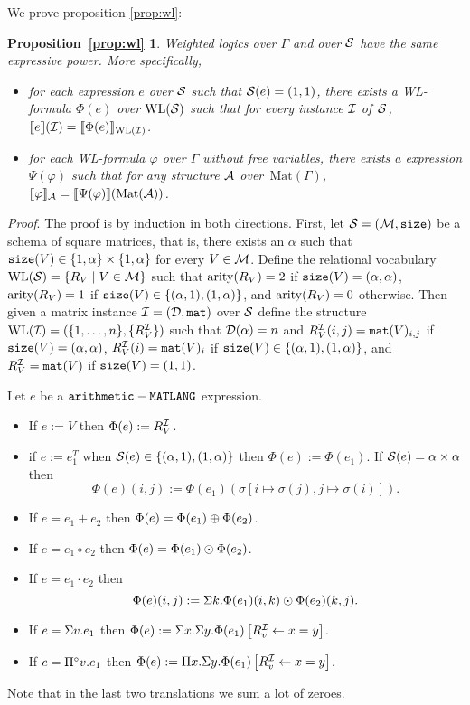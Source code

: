 \newtheorem*{WL}{Proposition~\ref{prop:wl}}

We prove proposition \ref{prop:wl}:

\begin{WL}
  Weighted logics over $\Gamma$ and \langprod over $\mathcal{S}$ have the same expressive power. More specifically,
  \begin{itemize}
  	\item for each \langprod expression $e$ over $\mathcal{S}$ such that $\mathcal{S}(e)=(1,1)$, there exists a WL-formula $\Phi(e)$ over $\text{WL}(\mathcal{S})$ such that for every instance $\mathcal{I}$ of~$\mathcal{S}$, 
  	$
  	\llbracket e \rrbracket(\mathcal{I}) = \llbracket \Phi(e) \rrbracket_{\text{WL}(\mathcal{I})}
  	$.
  	\item for each WL-formula $\varphi$ over $\Gamma$ without free variables, there exists a \langprod expression $\Psi(\varphi)$ such that for any structure $\mathcal{A}$ over~$\text{Mat}(\Gamma)$,
  	$
  	\llbracket \varphi \rrbracket_{\mathcal{A}}=\llbracket \Psi(\varphi) \rrbracket(\text{Mat}(\mathcal{A}))
  	$.
  \end{itemize}	
\end{WL}

\textit{Proof}. The proof is by induction in both directions. 
First, let $\mathcal{S}=(\mathcal{M},\texttt{size})$ be a schema of square matrices, that is, there exists an $\alpha$ such 
that $\texttt{size}(V) \in \{1, \alpha\} \times \{1,\alpha\}$ for every $V \in \mathcal{M}$.
Define the relational vocabulary $\text{WL}(\mathcal{S}) = \{R_V \mid V \in \mathcal{M}\}$ such that $\operatorname{arity}(R_V) = 2$ 
if $\texttt{size}(V) = (\alpha, \alpha)$, $\operatorname{arity}(R_V) = 1$ if $\texttt{size}(V) \in \{(\alpha,1), (1,\alpha)\}$, and 
$\operatorname{arity}(R_V) = 0$ otherwise.
Then given a matrix instance $\mathcal{I} = (\mathcal{D},\texttt{mat})$ over $\mathcal{S}$ define the structure 
$\text{WL}(\mathcal{I}) = (\{1, \ldots, n\}, \{R_V^{\mathcal{I}}\} )$ such that $\mathcal{D}(\alpha) = n$ and 
$R_V^{\mathcal{I}}(i, j) = \texttt{mat}(V)_{i,j}$ if $\texttt{size}(V) = (\alpha, \alpha)$, $R_V^{\mathcal{I}}(i) = \texttt{mat}(V)_{i}$ 
if $\texttt{size}(V) \in \{(\alpha,1), (1,\alpha)\}$, and $R_V^{\mathcal{I}} = \texttt{mat}(V)$ if $\texttt{size}(V) = (1,1)$.

Let $e$ be a $\texttt{arithmetic}-\texttt{MATLANG}$ expression.
\begin{itemize}
  \item If $e:=V$ then $\Phi(e):=R_V^{\mathcal{I}}$.
  \item if $e:= e_1^T$ when $\mathcal{S}(e)\in \{(\alpha,1), (1,\alpha)\}$ then $\Phi(e):=\Phi(e_1)$. If $\mathcal{S}(e)=\alpha\times\alpha$ then
  $$
  \Phi(e)(i,j):=\Phi(e_1)(\sigma\left[ i\mapsto \sigma(j), j\mapsto \sigma(i) \right]).
  $$
  \item If $e=e_1+e_2$ then $\Phi(e)=\Phi(e_1)\oplus \Phi(e_2)$.
  \item If $e=e_1\circ e_2$ then $\Phi(e)=\Phi(e_1)\odot \Phi(e_2)$.
  \item If $e=e_1\cdot e_2$ then 
  $$
  \Phi(e)(i,j):=\Sigma k. \Phi(e_1)(i,k)\odot\Phi(e_2)(k,j). 
  $$
  \item If $e=\Sigma v. e_1$ then $\Phi(e):=\Sigma x.\Sigma y.\Phi(e_1)\left[ R_v^{\mathcal{I}}\gets x=y \right]$.
  \item If $e=\Pi^{\circ} v. e_1$ then $\Phi(e):=\Pi x.\Sigma y.\Phi(e_1)\left[ R_v^{\mathcal{I}}\gets x=y \right]$.
\end{itemize}
Note that in the last two translations we sum a lot of zeroes.

